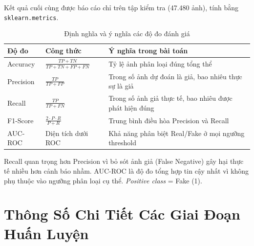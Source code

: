 Kết quả cuối cùng được báo cáo chỉ trên tập kiểm tra (47.480 ảnh), tính bằng \texttt{sklearn.metrics}.

\begin{table}[H]
  \centering
  \caption{Định nghĩa và ý nghĩa các độ đo đánh giá}
  \label{tab:metrics_def}
  \begin{tabularx}{\linewidth}{llX}
    \toprule
    \textbf{Độ đo} & \textbf{Công thức} & \textbf{Ý nghĩa trong bài toán} \\
    \midrule
    Accuracy  & $\frac{TP+TN}{TP+TN+FP+FN}$ & Tỷ lệ ảnh phân loại đúng tổng thể \\
    Precision & $\frac{TP}{TP+FP}$ & Trong số ảnh dự đoán là giả, bao nhiêu thực sự là giả \\
    Recall    & $\frac{TP}{TP+FN}$ & Trong số ảnh giả thực tế, bao nhiêu được phát hiện đúng \\
    F1-Score  & $\frac{2 \cdot P \cdot R}{P + R}$ & Trung bình điều hòa Precision và Recall \\
    AUC-ROC   & Diện tích dưới ROC & Khả năng phân biệt Real/Fake ở mọi ngưỡng threshold \\
    \bottomrule
  \end{tabularx}
\end{table}

Recall quan trọng hơn Precision vì bỏ sót ảnh giả (False Negative) gây hại thực tế nhiều hơn cảnh báo nhầm. AUC-ROC là độ đo tổng hợp tin cậy nhất vì không phụ thuộc vào ngưỡng phân loại cụ thể. \textit{Positive class} = Fake (1).

\section{Thông Số Chi Tiết Các Giai Đoạn Huấn Luyện}

